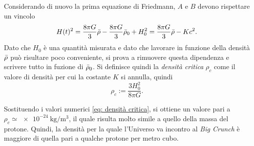 Considerando di nuovo la prima equazione di Friedmann, $A$ e $B$ devono rispettare un vincolo
\begin{equation}
    H(t)^2 = \frac{8\pi G}{3}\bar{\rho} - \frac{8\pi G}{3}\bar{\rho}_0 + H_0^2 = \frac{8\pi G}{3}\bar{\rho} - Kc^2.
\end{equation}
Dato che $H_0$ è una quantità misurata e dato che lavorare in funzione della densità $\bar{\rho}$ può risultare poco conveniente, si prova a rimuovere questa dipendenza e scrivere tutto in fuzione di $\bar{\rho}_0$. Si definisce quindi la \emph{densità critica} $\rho_c$ come il valore di densità per cui la costante $K$ si annulla, quindi 
\begin{equation}
\label{eq: densità critica}
    \rho_c := \frac{3H_0^2}{8\pi G}.
\end{equation}
\begin{obs}
    Sostituendo i valori numerici \eqref{eq: densità critica}, si ottiene un valore pari a $\rho_c \simeq \SI{e-24}{\kilogram\per\meter\cubed}$, il quale risulta molto simile a quello della massa del protone. Quindi, la densità per la quale l'Universo va incontro al \emph{Big Crunch} è maggiore di quella pari a qualche protone per metro cubo.
\end{obs}

